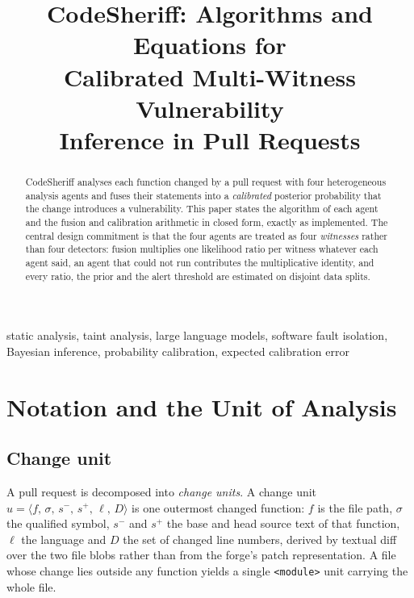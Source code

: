 \documentclass[conference]{IEEEtran}
\newcommand{\Unit}{u}
\begin{document}
\title{CodeSheriff: Algorithms and Equations for\\Calibrated Multi-Witness Vulnerability\\Inference in Pull Requests}

\author{
}

\maketitle

\begin{abstract}
CodeSheriff analyses each function changed by a pull request with four heterogeneous
analysis agents and fuses their statements into a \emph{calibrated} posterior probability
that the change introduces a vulnerability. This paper states the algorithm of each agent
and the fusion and calibration arithmetic in closed form, exactly as implemented. The
central design commitment is that the four agents are treated as four \emph{witnesses}
rather than four detectors: fusion multiplies one likelihood ratio per witness whatever each
agent said, an agent that could not run contributes the multiplicative identity, and every
ratio, the prior and the alert threshold are estimated on disjoint data splits.
\end{abstract}

\begin{IEEEkeywords}
static analysis, taint analysis, large language models, software fault isolation, Bayesian
inference, probability calibration, expected calibration error
\end{IEEEkeywords}

\section{Notation and the Unit of Analysis}

\subsection{Change unit}
A pull request is decomposed into \emph{change units}. A change unit
$\Unit=\langle f,\, \sigma,\, s^{-},\, s^{+},\, \ell,\, D\rangle$ is one outermost changed
function: $f$ is the file path, $\sigma$ the qualified symbol, $s^{-}$ and $s^{+}$ the base
and head source text of that function, $\ell$ the language and $D$ the set of changed line
numbers, derived by textual diff over the two file blobs rather than from the forge's patch
representation. A file whose change lies outside any function yields a single
\texttt{<module>} unit carrying the whole file.
\end{document}
